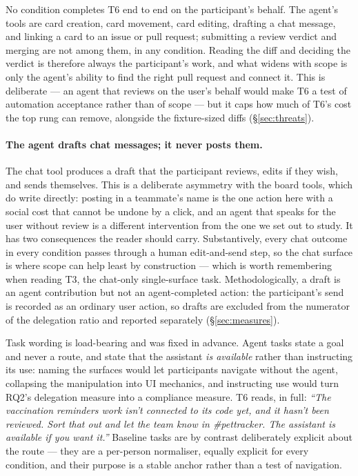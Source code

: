 \documentclass[acmsmall,review,screen]{acmart}
\begin{document}
No condition completes T6 end to end on the participant's behalf. The agent's
tools are card creation, card movement, card editing, drafting a chat message,
and linking a card to an issue or pull request; submitting a review verdict and
merging are not among them, in any condition. Reading the diff and deciding the
verdict is therefore always the participant's work, and what widens with scope
is only the agent's ability to find the right pull request and connect it. This
is deliberate --- an agent that reviews on the user's behalf would make T6 a
test of automation acceptance rather than of scope --- but it caps how much of
T6's cost the top rung can remove, alongside the fixture-sized diffs
(\S\ref{sec:threats}).

\paragraph{The agent drafts chat messages; it never posts them.} The chat tool
produces a draft that the participant reviews, edits if they wish, and sends
themselves. This is a deliberate asymmetry with the board tools, which do write
directly: posting in a teammate's name is the one action here with a social cost
that cannot be undone by a click, and an agent that speaks for the user without
review is a different intervention from the one we set out to study. It has two
consequences the reader should carry. Substantively, every chat outcome in every
condition passes through a human edit-and-send step, so the chat surface is where
scope can help least by construction --- which is worth remembering when reading
T3, the chat-only single-surface task. Methodologically, a draft is an agent
contribution but not an agent-completed action: the participant's send is
recorded as an ordinary user action, so drafts are excluded from the numerator of
the delegation ratio and reported separately (\S\ref{sec:measures}).

Task wording is load-bearing and was fixed in advance. Agent tasks state a goal
and never a route, and state that the assistant \emph{is available} rather than
instructing its use: naming the surfaces would let participants navigate without
the agent, collapsing the manipulation into UI mechanics, and instructing use
would turn RQ2's delegation measure into a compliance measure. T6 reads, in
full: \emph{``The vaccination reminders work isn't connected to its code yet,
and it hasn't been reviewed. Sort that out and let the team know in
\#pettracker. The assistant is available if you want it.''} Baseline tasks are
by contrast deliberately explicit about the route --- they are a per-person
normaliser, equally explicit for every condition, and their purpose is a stable
anchor rather than a test of navigation.
\end{document}
